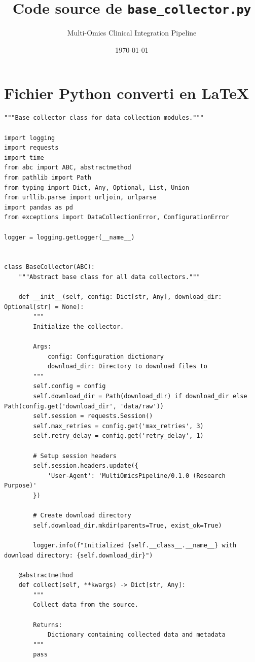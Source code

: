\documentclass[a4paper,11pt]{article}
\begin{document}
\title{Code source de \texttt{base\_collector.py}}
\author{Multi-Omics Clinical Integration Pipeline}
\date{\today}
\maketitle

\section*{Fichier Python converti en LaTeX}

\begin{lstlisting}[style=pythonstyle]
"""Base collector class for data collection modules."""

import logging
import requests
import time
from abc import ABC, abstractmethod
from pathlib import Path
from typing import Dict, Any, Optional, List, Union
from urllib.parse import urljoin, urlparse
import pandas as pd
from exceptions import DataCollectionError, ConfigurationError

logger = logging.getLogger(__name__)


class BaseCollector(ABC):
    """Abstract base class for all data collectors."""
    
    def __init__(self, config: Dict[str, Any], download_dir: Optional[str] = None):
        """
        Initialize the collector.
        
        Args:
            config: Configuration dictionary
            download_dir: Directory to download files to
        """
        self.config = config
        self.download_dir = Path(download_dir) if download_dir else Path(config.get('download_dir', 'data/raw'))
        self.session = requests.Session()
        self.max_retries = config.get('max_retries', 3)
        self.retry_delay = config.get('retry_delay', 1)
        
        # Setup session headers
        self.session.headers.update({
            'User-Agent': 'MultiOmicsPipeline/0.1.0 (Research Purpose)'
        })
        
        # Create download directory
        self.download_dir.mkdir(parents=True, exist_ok=True)
        
        logger.info(f"Initialized {self.__class__.__name__} with download directory: {self.download_dir}")
    
    @abstractmethod
    def collect(self, **kwargs) -> Dict[str, Any]:
        """
        Collect data from the source.
        
        Returns:
            Dictionary containing collected data and metadata
        """
        pass
    

\end{lstlisting}
\end{document}
